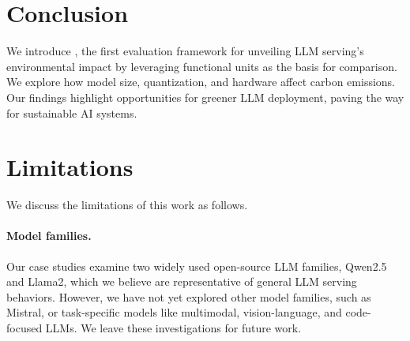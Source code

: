 \section{Conclusion} \label{sec:conclusion}

We introduce \SYSTEM{}, the first evaluation framework for unveiling LLM serving's environmental impact by leveraging functional units as the basis for comparison. We explore how model size, quantization, and hardware affect carbon emissions. Our findings highlight opportunities for greener LLM deployment, paving the way for sustainable AI systems.


\pagebreak

\section*{Limitations}

We discuss the limitations of this work as follows.

\paragraph{Model families.} Our case studies examine two widely used open-source LLM families, Qwen2.5 and Llama2, which we believe are representative of general LLM serving behaviors. However, we have not yet explored other model families, such as Mistral, or task-specific models like multimodal, vision-language, and code-focused LLMs. We leave these investigations for future work.

